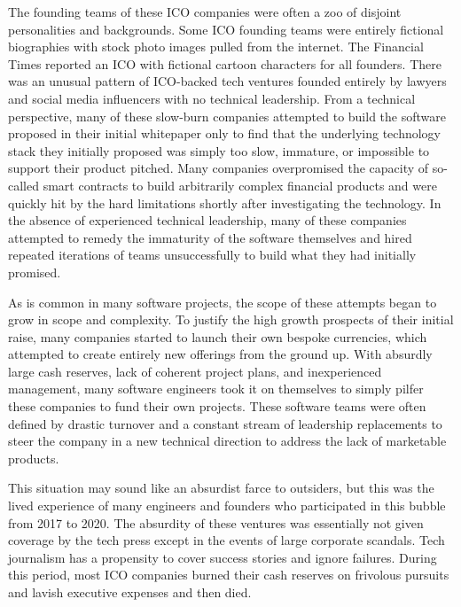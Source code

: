 The founding teams of these ICO companies were often a zoo of disjoint
personalities and backgrounds. Some ICO founding teams were entirely fictional
biographies with stock photo images pulled from the internet. The Financial
Times reported an ICO with fictional cartoon characters for all founders.
\cite{kelly_ico_2019} There was an unusual pattern of ICO-backed tech ventures
founded entirely by lawyers and social media influencers with no technical
leadership.  From a technical perspective, many of these slow-burn companies
attempted to build the software proposed in their initial whitepaper only to
find that the underlying technology stack they initially proposed was simply too
slow, immature, or impossible to support their product pitched. Many companies
overpromised the capacity of so-called smart contracts to build arbitrarily
complex financial products and were quickly hit by the hard limitations shortly
after investigating the technology. In the absence of experienced technical
leadership, many of these companies attempted to remedy the immaturity of the
software themselves and hired repeated iterations of teams unsuccessfully to
build what they had initially promised.


As is common in many software projects, the scope of these attempts began to
grow in scope and complexity. To justify the high growth prospects of their
initial raise, many companies started to launch their own bespoke currencies,
which attempted to create entirely new offerings from the ground up. With
absurdly large cash reserves, lack of coherent project plans, and inexperienced
management, many software engineers took it on themselves to simply pilfer these
companies to fund their own projects. These software teams were often defined by
drastic turnover and a constant stream of leadership replacements to steer the
company in a new technical direction to address the lack of marketable products.

This situation may sound like an absurdist farce to outsiders, but this was the
lived experience of many engineers and founders who participated in this bubble
from 2017 to 2020. The absurdity of these ventures was essentially not given
coverage by the tech press except in the events of large corporate scandals.
Tech journalism has a propensity to cover success stories and ignore failures.
During this period, most ICO companies burned their cash reserves on frivolous
pursuits and lavish executive expenses and then died.

